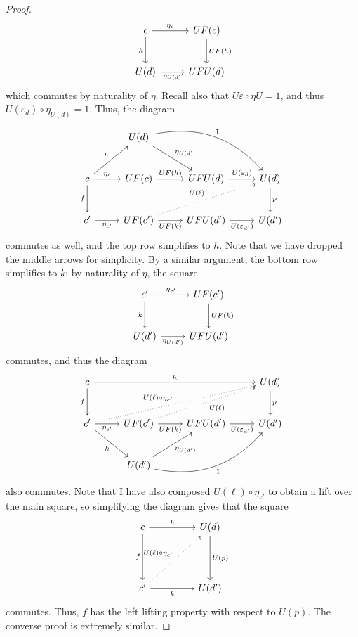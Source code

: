 \begin{proof}
	\[\begin{tikzcd}[row sep = 2.5em, column sep = 2.5em]
	c \ar[" \eta_c ", r] \ar[" h "', d]  & UF(c)\ar[" UF(h) ", d]  \\
	U(d)\ar[" \eta_{U(d)}  "', r]  & UFU(d)
	\end{tikzcd}\]
	which commutes by naturality of $\eta$. Recall also that $U\varepsilon \circ \eta U=1$, and thus $U(\varepsilon_d)\circ \eta_{U(d)} =1$. Thus, the diagram
	\[\begin{tikzcd}[row sep = 2.5em, column sep = 2.5em]
		& U(d)\ar[" \eta_{U(d)}  ", dr] \ar[" 1 ", bend left, drr] \\
	c \ar[" h ", ur]\ar[" \eta_c ", r] \ar[" f "', d]  & UF(c)\ar[" UF(h) ", r]   & UFU(d)\ar[" U(\varepsilon_d) ", r]   & U(d)\ar[" p ", d]  \\
	c'\ar[" \eta_{c'}  "', r]  & UF(c')\ar[" UF(k) "', r]\ar[" U(\ell)", dotted, urr]  & UFU(d')\ar[" U(\varepsilon_{d'})  "', r]  & U(d')
	\end{tikzcd}\]
	commutes as well, and the top row simplifies to $h$. Note that we have dropped the middle arrows for simplicity. By a similar argument, the bottom row simplifies to $k$: by naturality of $\eta$, the square
	\[\begin{tikzcd}[row sep = 2.5em, column sep = 2.5em]
	c' \ar[" \eta_{c'}  ", r] \ar[" k "', d]  & UF(c')\ar[" UF(k) ", d]  \\
	U(d')\ar[" \eta_{U(d')}  "', r]  & UFU(d')
	\end{tikzcd}\]
	commutes, and thus the diagram
	\[\begin{tikzcd}[row sep = 2.5em, column sep = 2.5em]
	c \ar[" h ", rrr] \ar[" f "', d]  &&& U(d)\ar[" p ", d]  \\
	c'\ar[" \eta_{c'}  "', r] \ar[" k "', dr] \ar[" U(\ell )\circ \eta_{c'}  ", dotted, urrr] & UF(c')\ar[" UF(k) "', r]\ar[" U(\ell ) "', dotted, urr]  & UFU(d')\ar[" U(\varepsilon_{d'})  "', r]  & U(d')\\
				   & U(d')\ar[" \eta_{U(d')}  "', ur] \ar[" 1 "', bend right, urr] 
	\end{tikzcd}\]
	also commutes. Note that I have also composed $U(\ell )\circ \eta_{c'} $ to obtain a lift over the main square, so simplifying the diagram gives that the square
	\[\begin{tikzcd}[row sep = 4.5em, column sep = 4.5em]
	c \ar[" f "', d] \ar[" h ", r]  & U(d)\ar[" U(p) ", d]  \\
	c' \ar[" U(\ell) \circ \eta_{c'}  ", dotted, ur] \ar[" k "', r]  & U(d')
	\end{tikzcd}\]
	commutes. Thus, $f$ has the left lifting property with respect to $U(p)$. The converse proof is extremely similar.


\end{proof}
